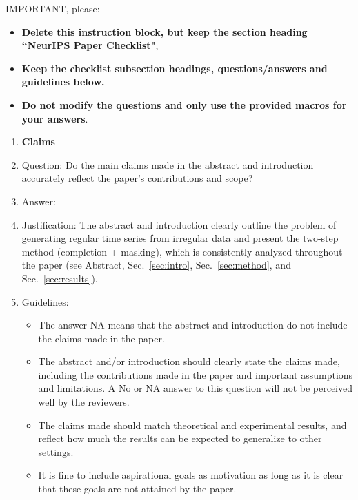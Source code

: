 \documentclass{article}
\theoremstyle{plain}
\theoremstyle{definition}
\theoremstyle{remark}
\begin{document}
{IMPORTANT, please:
\begin{itemize}
    \item {\bf Delete this instruction block, but keep the section heading ``NeurIPS Paper Checklist"},
    \item  {\bf Keep the checklist subsection headings, questions/answers and guidelines below.}
    \item {\bf Do not modify the questions and only use the provided macros for your answers}.
\end{itemize} 
 



\begin{enumerate}

\item {\bf Claims}
    \item[] Question: Do the main claims made in the abstract and introduction accurately reflect the paper's contributions and scope?
    \item[] Answer: \answerYes{}
    \item[] Justification: The abstract and introduction clearly outline the problem of generating regular time series from irregular data and present the two-step method (completion + masking), which is consistently analyzed throughout the paper (see Abstract, Sec.~\ref{sec:intro}, Sec.~\ref{sec:method}, and Sec.~\ref{sec:results}).
    \item[] Guidelines:
    \begin{itemize}
        \item The answer NA means that the abstract and introduction do not include the claims made in the paper.
        \item The abstract and/or introduction should clearly state the claims made, including the contributions made in the paper and important assumptions and limitations. A No or NA answer to this question will not be perceived well by the reviewers. 
        \item The claims made should match theoretical and experimental results, and reflect how much the results can be expected to generalize to other settings. 
        \item It is fine to include aspirational goals as motivation as long as it is clear that these goals are not attained by the paper. 
    \end{itemize}


\end{enumerate}}
\end{document}
